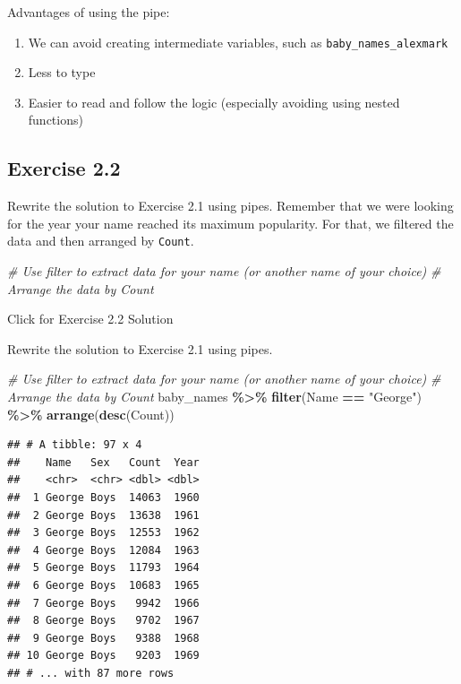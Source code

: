 \documentclass[
]{book}
\newenvironment{Shaded}{\begin{snugshade}}{\end{snugshade}}
\newcommand{\CommentTok}[1]{\textcolor[rgb]{0.56,0.35,0.01}{\textit{#1}}}
\newcommand{\KeywordTok}[1]{\textcolor[rgb]{0.13,0.29,0.53}{\textbf{#1}}}
\newcommand{\NormalTok}[1]{#1}
\newcommand{\OperatorTok}[1]{\textcolor[rgb]{0.81,0.36,0.00}{\textbf{#1}}}
\newcommand{\StringTok}[1]{\textcolor[rgb]{0.31,0.60,0.02}{#1}}
\providecommand{\tightlist}{%
  \setlength{\itemsep}{0pt}\setlength{\parskip}{0pt}}
\begin{document}
Advantages of using the pipe:

\begin{enumerate}
\def\labelenumi{\arabic{enumi}.}
\tightlist
\item
  We can avoid creating intermediate variables, such as \texttt{baby\_names\_alexmark}
\item
  Less to type
\item
  Easier to read and follow the logic (especially avoiding using nested functions)
\end{enumerate}

\hypertarget{exercise-2.2}{%
\subsection{Exercise 2.2}\label{exercise-2.2}}

Rewrite the solution to Exercise 2.1 using pipes. Remember that we were looking
for the year your name reached its maximum popularity. For that, we filtered
the data and then arranged by \texttt{Count}.

\begin{Shaded}
\begin{Highlighting}[]
\CommentTok{\# Use filter to extract data for your name (or another name of your choice)}
\CommentTok{\# Arrange the data by Count}
\end{Highlighting}
\end{Shaded}

{Click for Exercise 2.2 Solution}

\begin{alert}

Rewrite the solution to Exercise 2.1 using pipes.

\begin{Shaded}
\begin{Highlighting}[]
\CommentTok{\# Use filter to extract data for your name (or another name of your choice)}
\CommentTok{\# Arrange the data by Count}
\NormalTok{baby\_names }\OperatorTok{\%\textgreater{}\%}\StringTok{ }
\StringTok{    }\KeywordTok{filter}\NormalTok{(Name }\OperatorTok{==}\StringTok{ "George"}\NormalTok{) }\OperatorTok{\%\textgreater{}\%}
\StringTok{    }\KeywordTok{arrange}\NormalTok{(}\KeywordTok{desc}\NormalTok{(Count))}
\end{Highlighting}
\end{Shaded}

\begin{verbatim}
## # A tibble: 97 x 4
##    Name   Sex   Count  Year
##    <chr>  <chr> <dbl> <dbl>
##  1 George Boys  14063  1960
##  2 George Boys  13638  1961
##  3 George Boys  12553  1962
##  4 George Boys  12084  1963
##  5 George Boys  11793  1964
##  6 George Boys  10683  1965
##  7 George Boys   9942  1966
##  8 George Boys   9702  1967
##  9 George Boys   9388  1968
## 10 George Boys   9203  1969
## # ... with 87 more rows
\end{verbatim}

\end{alert}
\end{document}
